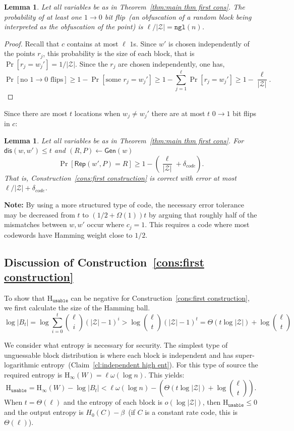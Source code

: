 \documentclass[11pt]{article}
\newcommand{\thref}[1]{\mbox{Theorem~\ref{#1}}}
\newcommand{\clref}[1]{\mbox{Claim~\ref{#1}}}
\newcommand{\consref}[1]{\mbox{Construction~\ref{#1}}}
\newcommand{\class}[1]{{\ensuremath{\mathsf{#1}}}}
\newcommand{\gen}{\ensuremath{\class{Gen}}\xspace}
\newcommand{\rep}{\ensuremath{\class{Rep}}\xspace}
\newcommand{\dis}{\ensuremath{\mathsf{dis}}}
\newcommand{\ngl}{\ensuremath{\mathtt{ngl}}\xspace}
\newcommand{\Hoo}{\mathrm{H}_\infty}
\newcommand{\Huse}{\mathrm{H}_{\mathtt{usable}}}
\newtheorem{lemma}[theorem]{Lemma}
\begin{document}
\begin{lemma}
\label{lem:no 1 to 0 flips}
Let all variables be as in \thref{thm:main thm first cons}.
The probability of at least one $1\rightarrow 0$ bit flip~(an obfuscation of a random block being interpreted as the obfuscation of the point) is $ \ell/|\mathcal{Z}| = \ngl(n)$.
\end{lemma}
\begin{proof}
Recall that $c$ contains at most $\ell$ $1$s.  Since $w'$ is chosen independently of the points $r_j$, this probability is the size of each block, that is $\Pr[r_j =w_j']  = 1/|\mathcal{Z}|$. Since the $r_j$ are chosen independently, one has,
\[
\Pr[\text{no $1\rightarrow 0$ flips}] \geq 1-\Pr[\text{some }r_j = w_j']\geq 1-\sum_{j=1}^\ell \Pr[r_j = w_j'] \geq 1-\frac{\ell}{|\mathcal{Z}|}.
\]
\end{proof}

Since there are most $t$ locations when $w_j\neq w_j'$ there are at most $t$ $0\rightarrow 1$ bit flips in $c$:

\begin{lemma}
\label{lem:correct of cons}
Let all variables be as in \thref{thm:main thm first cons}.
For $\dis(w, w')\leq t$ and $(R, P)\leftarrow \gen(w)$
\[
\Pr[\rep( w', P) = R] \geq 1-\left(\frac{\ell}{|\mathcal{Z}|}+\delta_{code}\right).
\]
That is, \consref{cons:first construction} is correct with error at most $\ell/|\mathcal{Z}|+\delta_{code}$.
\end{lemma}

\textbf{Note: }By using a more structured type of code, the necessary error tolerance may be decreased from $t$ to  $(1/2+\Omega(1))t$ by arguing that roughly half of the mismatches between $w, w'$ occur where $c_j =1$.  This requires a code where most codewords have Hamming weight close to $1/2$.

\subsection{Discussion of \consref{cons:first construction}}
\label{sec:discussion}
To show that $\Huse$ can be negative for \consref{cons:first construction}, we first calculate the size of the Hamming ball.  
\[
\log |B_t| = \log \sum_{i=0}^t {\ell \choose i} (|\mathcal{Z}|-1)^i> \log {\ell \choose t} (|\mathcal{Z}|-1)^t =\Theta(t\log |\mathcal{Z}|) + \log {\ell\choose t}
\]

We consider what entropy is necessary for security.  The simplest type of unguessable block distribution is where each block is independent and has super-logarithmic entropy~(\clref{cl:independent high ent}).  For this type of source the required entropy is $\Hoo(W) = \ell\omega(\log n)$.  This yields:
\[
\Huse = \Hoo(W) - \log |B_t| < \ell \omega(\log n) -\left( \Theta(t\log |\mathcal{Z}|) + \log {\ell \choose t}\right).
\]
When $t =\Theta(\ell)$ and the entropy of each block is $o(\log |\mathcal{Z}|)$, then $\Huse\le 0$ and the output entropy is $H_0(C) -\beta$~(if $C$ is a constant rate code, this is $\Theta(\ell)$).
\end{document}
